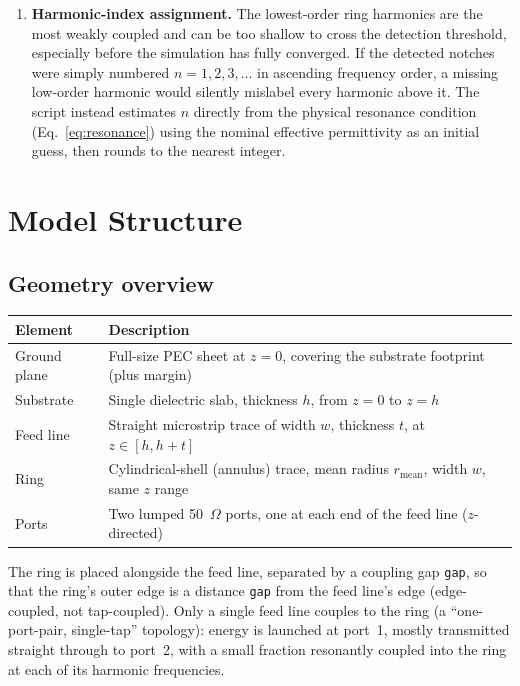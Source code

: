 \documentclass[11pt]{article}
\begin{document}
\begin{enumerate}[leftmargin=*]
\item \textbf{Harmonic-index assignment.} The lowest-order ring harmonics
are the most weakly coupled and can be too shallow to cross the detection
threshold, especially before the simulation has fully converged. If the
detected notches were simply numbered $n=1,2,3,\dots$ in ascending frequency
order, a missing low-order harmonic would silently mislabel every harmonic
above it. The script instead estimates $n$ directly from the physical
resonance condition (Eq.~\ref{eq:resonance}) using the nominal effective
permittivity as an initial guess, then rounds to the nearest integer.

\end{enumerate}

\section{Model Structure}

\subsection{Geometry overview}

\begin{center}
\begin{tabular}{@{}ll@{}}
\toprule
\textbf{Element} & \textbf{Description} \\
\midrule
Ground plane & Full-size PEC sheet at $z=0$, covering the substrate footprint (plus margin) \\
Substrate & Single dielectric slab, thickness $h$, from $z=0$ to $z=h$ \\
Feed line & Straight microstrip trace of width $w$, thickness $t$, at $z \in [h, h+t]$ \\
Ring & Cylindrical-shell (annulus) trace, mean radius $r_{\mathrm{mean}}$, width $w$, same $z$ range \\
Ports & Two lumped 50~$\Omega$ ports, one at each end of the feed line ($z$-directed) \\
\bottomrule
\end{tabular}
\end{center}

The ring is placed alongside the feed line, separated by a coupling gap
\texttt{gap}, so that the ring's outer edge is a distance \texttt{gap} from
the feed line's edge (edge-coupled, not tap-coupled). Only a single feed
line couples to the ring (a ``one-port-pair, single-tap'' topology): energy
is launched at port~1, mostly transmitted straight through to port~2, with a
small fraction resonantly coupled into the ring at each of its harmonic
frequencies.
\end{document}
